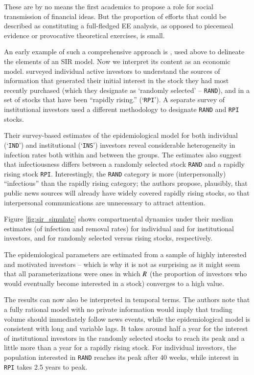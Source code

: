 These are by no means the first academics to propose a role for social transmission of financial ideas.  But the proportion of efforts that could be described as constituting a full-fledged EE analysis, as opposed to piecemeal evidence or provocative theoretical exercises, is small. %

An early example of such a comprehensive approach is  \cite{shiller1989survey}, used above to delineate the elements of an SIR model.  Now we interpret its content as an economic model.  \cite{shiller1989survey} surveyed individual active investors to understand the sources of information that generated their initial interest in the stock they had most recently purchased (which they designate as `randomly selected' -- \texttt{RAND}), and in a set of stocks that have been ``rapidly rising.'' (`\texttt{RPI}').  A separate survey of institutional investors used a different methodology to designate \texttt{RAND} and \texttt{RPI} stocks. %

Their survey-based estimates of the epidemiological model for both individual (`\texttt{IND}') and institutional (`\texttt{INS}') investors reveal considerable heterogeneity in infection rates both within and between the groups. The estimates also suggest that infectiousness differs between a randomly selected stock \texttt{RAND} and a rapidly rising stock \texttt{RPI}. Interestingly, the \texttt{RAND} category is more (interpersonally) ``infectious'' than the rapidly rising category; the authors propose, plausibly, that public news sources will already have widely covered rapidly rising stocks, so that interpersonal communications are unnecessary to attract attention.

Figure \ref{fig:sir_simulate} shows compartmental dynamics under their median estimates (of infection and removal rates) for individual and for institutional investors, and for randomly selected versus rising stocks, respectively.

The epidemiological parameters are estimated from a sample of highly interested and motivated investors -- which is why it is not as surprising as it might seem that all parameterizations were ones in which $R$ (the proportion of investors who would eventually become interested in a stock) converges to a high value.

The results can now also be interpreted in temporal terms.  The authors note that a fully rational model with no private information would imply that trading volume should immediately follow news events, while the epidemiological model is consistent with long and variable lags.  It takes around half a year for the interest of institutional investors in the randomly selected stocks to reach its peak and a little more than a year for a rapidly rising stock. For individual investors, the population interested in \texttt{RAND} reaches its peak after 40 weeks, while interest in \texttt{RPI} takes 2.5 years to peak.

